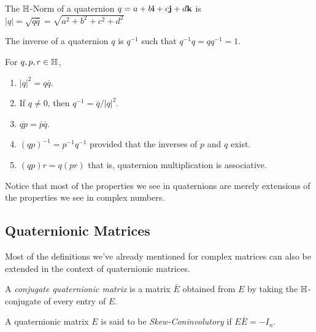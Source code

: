 \begin{definition}[$\HH$-Norm]
	The $\HH$-Norm of a quaternion $q = a + b\textbf{i} + c\textbf{j} + d\textbf{k}$ is $|q| = \sqrt{q\bar{q}} = \sqrt{a^2+b^2+c^2+d^2}$
\end{definition}

\begin{definition}[Inverse]
	The inverse of a quaternion $q$ is $q^{-1}$ such that $q^{-1}q = qq^{-1} = 1$.
\end{definition}

\begin{theorem}
For $q, p, r \in \operatorname{\mathbb{H}}$,
	\begin{enumerate}
		\item $|q|^2 = q\bar{q}$.
		\item If $q\neq 0$, then $q^{-1} = \bar{q}/|q|^2$.
		\item $\overline{qp} = \bar{p}\bar{q}$.
		\item $(qp)^{-1} = p^{-1}q^{-1}$ provided that the inverses of $p$ and $q$ exist.
		\item $(qp)r = q(pr)$ that is, quaternion multiplication is associative.
	\end{enumerate}
\end{theorem}


\begin{remark}
	Notice that most of the properties we see in quaternions are merely extensions of the properties we see in complex numbers. 
\end{remark}

\subsection{Quaternionic Matrices}

Most of the definitions we've already mentioned for complex matrices can also be extended in the context of quaternionic matrices.

\begin{definition}
	A \emph{conjugate quaternionic matrix} is a matrix $\bar{E}$ obtained from $E$ by taking the $\HH$-conjugate of every entry of $E$.
\end{definition}

\begin{definition}
	A quaternionic matrix $E$ is said to be \emph{Skew-Coninvolutory} if $E\bar{E} = -I_n$.
\end{definition}

